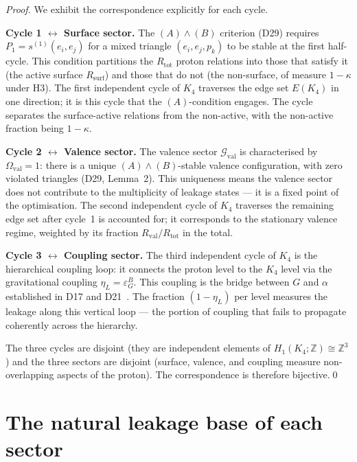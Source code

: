 \documentclass[12pt,a4paper]{article}
\newcommand{\Kfour}{K_4}
\newcommand{\Rsurf}{R_{\mathrm{surf}}}
\newcommand{\Rtot}{R_{\mathrm{tot}}}
\newcommand{\Rval}{R_{\mathrm{val}}}
\newcommand{\kap}{\kappa}
\newcommand{\etaL}{\eta_L}
\newcommand{\Ov}{\Omega_{\mathrm{val}}}
\newcommand{\Gval}{\mathcal{G}_{\mathrm{val}}}
\begin{document}
\begin{proof}
We exhibit the correspondence explicitly for each cycle.

\textbf{Cycle 1 $\leftrightarrow$ Surface sector.} The $(A)\wedge(B)$ criterion (D29) requires $P_1 = s^{(1)}(e_i, e_j)$ for a mixed triangle $(e_i, e_j, p_k)$ to be stable at the first half-cycle. This condition partitions the $\Rtot$ proton relations into those that satisfy it (the active surface $\Rsurf$) and those that do not (the non-surface, of measure $1-\kap$ under H3). The first independent cycle of $\Kfour$ traverses the edge set $E(\Kfour)$ in one direction; it is this cycle that the $(A)$-condition engages. The cycle separates the surface-active relations from the non-active, with the non-active fraction being $1-\kap$.

\textbf{Cycle 2 $\leftrightarrow$ Valence sector.} The valence sector $\Gval$ is characterised by $\Ov = 1$: there is a unique $(A)\wedge(B)$-stable valence configuration, with zero violated triangles (D29, Lemma~2). This uniqueness means the valence sector does not contribute to the multiplicity of leakage states — it is a fixed point of the optimisation. The second independent cycle of $\Kfour$ traverses the remaining edge set after cycle~1 is accounted for; it corresponds to the stationary valence regime, weighted by its fraction $\Rval/\Rtot$ in the total.

\textbf{Cycle 3 $\leftrightarrow$ Coupling sector.} The third independent cycle of $\Kfour$ is the hierarchical coupling loop: it connects the proton level to the $\Kfour$ level via the gravitational coupling $\etaL = \varepsilon_G^B$. This coupling is the bridge between $G$ and $\alpha$ established in D17 and D21~\cite{PDL_D17_2026,PDL_D21_2026}. The fraction $(1-\etaL)$ per level measures the leakage along this vertical loop — the portion of coupling that fails to propagate coherently across the hierarchy.

The three cycles are disjoint (they are independent elements of $H_1(\Kfour; \mathbb{Z}) \cong \mathbb{Z}^3$) and the three sectors are disjoint (surface, valence, and coupling measure non-overlapping aspects of the proton). The correspondence is therefore bijective.\qed
\end{proof}

\section{The natural leakage base of each sector}
\label{sec:bases}
\end{document}

